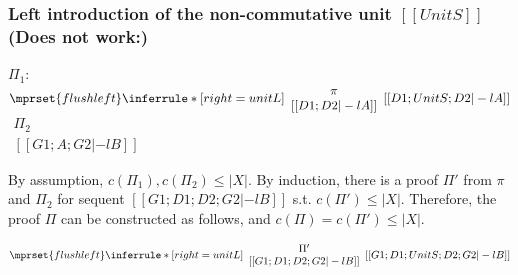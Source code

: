 \subsubsection{Left introduction of the non-commutative unit $[[UnitS]]$ (Does not work:)}
\begin{center}
  \scriptsize
  $\Pi_1$:
  \begin{math}
    $$\mprset{flushleft}
    \inferrule* [right={\tiny unitL}] {
      {
        \begin{array}{c}
          \pi \\
          {[[D1; D2 |-l A]]}
        \end{array}
      }
    }{[[D1; UnitS; D2 |-l A]]}
  \end{math}
  \qquad\qquad
  \begin{math}
    \begin{array}{c}
      \Pi_2 \\
      {[[G1; A; G2 |-l B]]}
    \end{array}
  \end{math}
\end{center}
By assumption, $c(\Pi_1),c(\Pi_2)\leq |X|$. By induction, there is a
proof $\Pi'$ from $\pi$ and $\Pi_2$ for sequent
$[[G1; D1; D2; G2 |-l B]]$
s.t. $c(\Pi')\leq |X|$. Therefore, the proof $\Pi$ can be constructed
as follows, and $c(\Pi)=c(\Pi')\leq |X|$.
\begin{center}
  \scriptsize
  \begin{math}
    $$\mprset{flushleft}
    \inferrule* [right={\tiny unitL}] {
      {
        \begin{array}{c}
          \Pi' \\
          {[[G1; D1; D2; G2 |-l B]]}
        \end{array}
      }
    }{[[G1; D1; UnitS; D2; G2 |-l B]]}
  \end{math}
\end{center}



